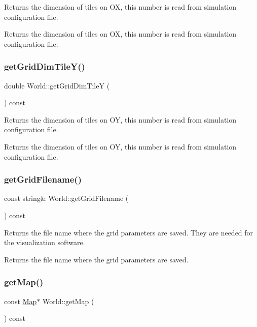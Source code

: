 Returns the dimension of tiles on OX, this number is read from simulation configuration file. \begin{DoxyReturn}{Returns}
the dimension of tiles on OX, this number is read from simulation configuration file. 
\end{DoxyReturn}
\mbox{\label{class_world_a99a004c6f3ce1a3a76894bb1f9625bbe}} 
\subsubsection{\texorpdfstring{getGridDimTileY()}{getGridDimTileY()}}
{\footnotesize\ttfamily double World\+::get\+Grid\+Dim\+TileY (\begin{DoxyParamCaption}{ }\end{DoxyParamCaption}) const}

Returns the dimension of tiles on OY, this number is read from simulation configuration file. \begin{DoxyReturn}{Returns}
the dimension of tiles on OY, this number is read from simulation configuration file. 
\end{DoxyReturn}
\mbox{\label{class_world_a7d07b06f9884185161c5cc34034a7212}} 
\subsubsection{\texorpdfstring{getGridFilename()}{getGridFilename()}}
{\footnotesize\ttfamily const string\& World\+::get\+Grid\+Filename (\begin{DoxyParamCaption}{ }\end{DoxyParamCaption}) const}

Returns the file name where the grid parameters are saved. They are needed for the visualization software. \begin{DoxyReturn}{Returns}
the file name where the grid parameters are saved. 
\end{DoxyReturn}
\mbox{\label{class_world_a33b8543ee812ae4f8ff93329444da4cb}} 
\subsubsection{\texorpdfstring{getMap()}{getMap()}}
{\footnotesize\ttfamily const \mbox{\hyperlink{class_map}{Map}}$\ast$ World\+::get\+Map (\begin{DoxyParamCaption}{ }\end{DoxyParamCaption}) const}

